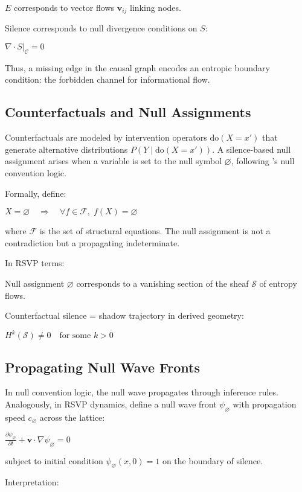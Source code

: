 \documentclass[12pt,a4paper]{article}
\begin{document}
$E$ corresponds to vector flows $\mathbf{v}_{ij}$ linking nodes.

Silence corresponds to null divergence conditions on $S$:

$\nabla \cdot S|_{\mathcal{C}} = 0$

Thus, a missing edge in the causal graph encodes an entropic boundary condition: the forbidden channel for informational flow.

\subsection{Counterfactuals and Null Assignments}

Counterfactuals are modeled by intervention operators $\mathrm{do}(X=x')$ that generate alternative distributions $P(Y \mid \mathrm{do}(X=x'))$. A silence-based null assignment arises when a variable is set to the null symbol $\varnothing$, following \citet{Subrahmanian1987}'s null convention logic.

Formally, define:

$X = \varnothing \quad \Rightarrow \quad \forall f \in \mathcal{F}, \; f(X) = \varnothing$

where $\mathcal{F}$ is the set of structural equations. The null assignment is not a contradiction but a propagating indeterminate.

In RSVP terms:

Null assignment $\varnothing$ corresponds to a vanishing section of the sheaf $\mathcal{S}$ of entropy flows.

Counterfactual silence = shadow trajectory in derived geometry:

$H^k(\mathcal{S}) \neq 0 \quad \text{for some } k > 0$

\subsection{Propagating Null Wave Fronts}

In null convention logic, the null wave propagates through inference rules. Analogously, in RSVP dynamics, define a null wave front $\psi_{\varnothing}$ with propagation speed $c_\varnothing$ across the lattice:

$\frac{\partial \psi_{\varnothing}}{\partial t} + \mathbf{v} \cdot \nabla \psi_{\varnothing} = 0$

subject to initial condition $\psi_{\varnothing}(x,0) = 1$ on the boundary of silence.

Interpretation:
\end{document}
